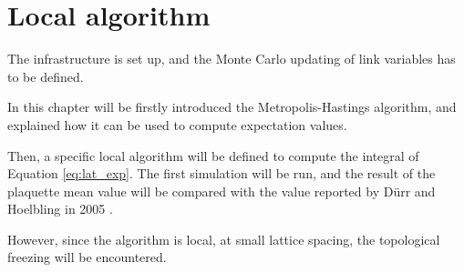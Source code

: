 \chapter{Local algorithm}\label{ch:local}

The infrastructure is set up, and the Monte Carlo updating of link variables has to be defined.

In this chapter will be firstly introduced the Metropolis-Hastings algorithm,
and explained how it can be used to compute expectation values.

Then, a specific local algorithm will be defined to compute the integral of Equation \eqref{eq:lat_exp}.
The first simulation will be run,
and the result of the plaquette mean value will be compared with the value reported by D\"urr and Hoelbling in 2005 \cite{durr-hoelbling:2005}.

However, since the algorithm is local, at small lattice spacing, the topological freezing will be encountered.


